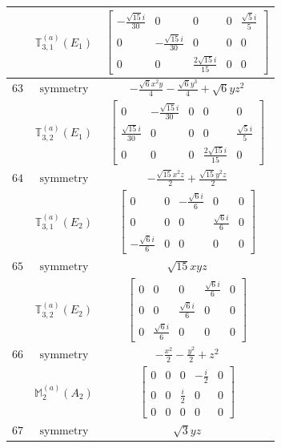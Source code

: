 \documentclass[fleqn,8pt,landscape]{jsarticle}
\begin{document}
\begin{longtable}{ccc}
$  $ & $ \mathbb{T}_{3,1}^{(a)}(E_{1}) $ & $ \begin{bmatrix} - \frac{\sqrt{15} i}{30} & 0 & 0 & 0 & \frac{\sqrt{5} i}{5} \\ 0 & - \frac{\sqrt{15} i}{30} & 0 & 0 & 0 \\ 0 & 0 & \frac{2 \sqrt{15} i}{15} & 0 & 0 \end{bmatrix} $ \\ \hline
$ 63 $ & $ \text{symmetry} $ & $ - \frac{\sqrt{6} x^{2} y}{4} - \frac{\sqrt{6} y^{3}}{4} + \sqrt{6} y z^{2} $ \\
$  $ & $ \mathbb{T}_{3,2}^{(a)}(E_{1}) $ & $ \begin{bmatrix} 0 & - \frac{\sqrt{15} i}{30} & 0 & 0 & 0 \\ \frac{\sqrt{15} i}{30} & 0 & 0 & 0 & \frac{\sqrt{5} i}{5} \\ 0 & 0 & 0 & \frac{2 \sqrt{15} i}{15} & 0 \end{bmatrix} $ \\ \hline
$ 64 $ & $ \text{symmetry} $ & $ - \frac{\sqrt{15} x^{2} z}{2} + \frac{\sqrt{15} y^{2} z}{2} $ \\
$  $ & $ \mathbb{T}_{3,1}^{(a)}(E_{2}) $ & $ \begin{bmatrix} 0 & 0 & - \frac{\sqrt{6} i}{6} & 0 & 0 \\ 0 & 0 & 0 & \frac{\sqrt{6} i}{6} & 0 \\ - \frac{\sqrt{6} i}{6} & 0 & 0 & 0 & 0 \end{bmatrix} $ \\ \hline
$ 65 $ & $ \text{symmetry} $ & $ \sqrt{15} x y z $ \\
$  $ & $ \mathbb{T}_{3,2}^{(a)}(E_{2}) $ & $ \begin{bmatrix} 0 & 0 & 0 & \frac{\sqrt{6} i}{6} & 0 \\ 0 & 0 & \frac{\sqrt{6} i}{6} & 0 & 0 \\ 0 & \frac{\sqrt{6} i}{6} & 0 & 0 & 0 \end{bmatrix} $ \\ \hline
$ 66 $ & $ \text{symmetry} $ & $ - \frac{x^{2}}{2} - \frac{y^{2}}{2} + z^{2} $ \\
$  $ & $ \mathbb{M}_{2}^{(a)}(A_{2}) $ & $ \begin{bmatrix} 0 & 0 & 0 & - \frac{i}{2} & 0 \\ 0 & 0 & \frac{i}{2} & 0 & 0 \\ 0 & 0 & 0 & 0 & 0 \end{bmatrix} $ \\ \hline
$ 67 $ & $ \text{symmetry} $ & $ \sqrt{3} y z $ \\

\end{longtable}
\end{document}
